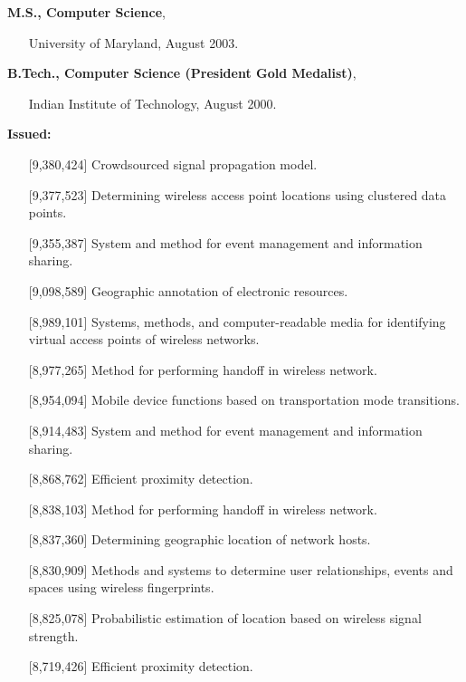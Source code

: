 \begin{resume}
{\bf M.S., Computer Science},   	
    \begin{itemize}
         \item[] University of Maryland, August 2003.
    \end{itemize}

{\bf B.Tech., Computer Science (President Gold Medalist)},
    \begin{itemize}
          \item[] Indian Institute of Technology, August 2000.
    \end{itemize}


\vspace{-0.7cm}

{\bf Issued:}
    \begin{itemize}
       \item [] [9,380,424] Crowdsourced signal propagation model.
       \item [] [9,377,523] Determining wireless access point locations using clustered data points.
       \item [] [9,355,387] System and method for event management and information sharing.
       \item [] [9,098,589] Geographic annotation of electronic resources.
       \item [] [8,989,101] Systems, methods, and computer-readable media for identifying virtual access points of
           wireless networks.
       \item [] [8,977,265] Method for performing handoff in wireless network.
       \item [] [8,954,094] Mobile device functions based on transportation mode transitions.
       \item [] [8,914,483] System and method for event management and information sharing.
       \item [] [8,868,762] Efficient proximity detection.
       \item [] [8,838,103] Method for performing handoff in wireless network.
       \item [] [8,837,360] Determining geographic location of network hosts.
       \item [] [8,830,909] Methods and systems to determine user relationships, events and spaces using wireless
           fingerprints.
       \item [] [8,825,078] Probabilistic estimation of location based on wireless signal strength.
       \item [] [8,719,426] Efficient proximity detection.

\end{itemize}
\end{resume}
